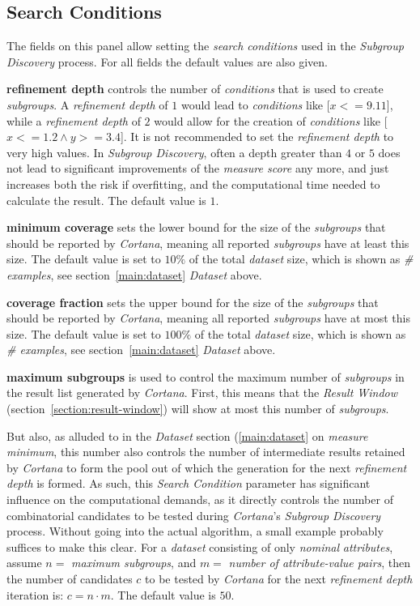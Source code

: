 \documentclass{article}
\begin{document}
\subsection{Search Conditions}
\label{main:search-conditions}

The fields on this panel allow setting the \emph{search conditions} used in the \emph{Subgroup Discovery} process.
For all fields the default values are also given.

\textbf{refinement depth} controls the number of \emph{conditions} that is used to create \emph{subgroups}.
A \emph{refinement depth} of $1$ would lead to \emph{conditions} like \mbox{[$x <= 9.11$]}, while a \emph{refinement depth} of $2$ would allow for the creation of \emph{conditions} like \mbox{[$x <= 1.2 \wedge y >= 3.4$]}.
It is not recommended to set the \emph{refinement depth} to very high values.
In \emph{Subgroup Discovery}, often a depth greater than $4$ or $5$ does not lead to significant improvements of the \emph{measure score} any more, and just increases both the risk if overfitting, and the computational time needed to calculate the result.
The default value is $1$.

\textbf{minimum coverage} sets the lower bound for the size of the \emph{subgroups} that should be reported by \emph{Cortana}, meaning all reported \emph{subgroups} have at least this size.
The default value is set to $10\%$ of the total \emph{dataset} size, which is shown as \emph{\# examples}, see section~\ref{main:dataset} \emph{Dataset} above.

\textbf{coverage fraction} sets the upper bound for the size of the \emph{subgroups} that should be reported by \emph{Cortana}, meaning all reported \emph{subgroups} have at most this size.
The default value is set to $100\%$ of the total \emph{dataset} size, which is shown as \emph{\# examples}, see section~\ref{main:dataset} \emph{Dataset} above.

\textbf{maximum subgroups} is used to control the maximum number of \emph{subgroups} in the result list generated by \emph{Cortana}.
First, this means that the \emph{Result Window} (section~\ref{section:result-window}) will show at most this number of \emph{subgroups}.

But also, as alluded to in the \emph{Dataset} section (\ref{main:dataset} on \emph{measure minimum}, this number also controls the number of intermediate results retained by \emph{Cortana} to form the pool out of which the generation for the next \emph{refinement depth} is formed.
As such, this \emph{Search Condition} parameter has significant influence on the computational demands, as it directly controls the number of combinatorial candidates to be tested during \emph{Cortana}'s \emph{Subgroup Discovery} process.
Without going into the actual algorithm, a small example probably suffices to make this clear.
For a \emph{dataset} consisting of only \emph{nominal} \emph{attributes}, assume $n =$ \emph{maximum subgroups}, and $m =$ \emph{number of attribute-value pairs}, then the number of candidates $c$ to be tested by \emph{Cortana} for the next \emph{refinement depth} iteration is: $c = n \cdot m$.
The default value is $50$.
\end{document}
